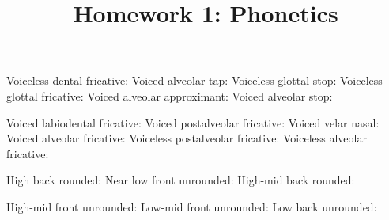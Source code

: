 \documentclass[addpoints]{exam}
\title{Homework 1: Phonetics}
\date{}
\begin{document}
  \maketitle

  


  \begin{questions}
      \parbox[t]{0.45\linewidth}{
        \question[1] \hrulefill
        \question[1] \hrulefill
        \question[1] \hrulefill
        \question[1] \hrulefill
        \question[1] \hrulefill
      }
      \hspace{0.1\linewidth}
      \parbox[t]{0.45\linewidth}{
        \question[1] \hrulefill
        \question[1] \hrulefill
        \question[1] \hrulefill
        \question[1] \hrulefill
        \question[1] \hrulefill
      }

      \parbox[t]{0.45\linewidth}{
        \question[1] Voiceless dental fricative: \hrulefill
        \question[1] Voiced alveolar tap: \hrulefill
        \question[1] Voiceless glottal stop: \hrulefill
        \question[1] Voiceless glottal fricative: \hrulefill
        \question[1] Voiced alveolar approximant: \hrulefill
        \question[1] Voiced alveolar stop: \hrulefill
      }
      \hspace{0.1\linewidth}
      \parbox[t]{0.45\linewidth}{
        \question[1] Voiced labiodental fricative: \hrulefill
        \question[1] Voiced postalveolar fricative: \hrulefill
        \question[1] Voiced velar nasal: \hrulefill
        \question[1] Voiced alveolar fricative: \hrulefill
        \question[1] Voiceless postalveolar fricative: \hrulefill
        \question[1] Voiceless alveolar fricative: \hrulefill
      }

      \parbox[t]{0.45\linewidth}{
        \question[1] High back rounded: \hrulefill
        \question[1] Near low front unrounded: \hrulefill
        \question[1] High-mid back rounded: \hrulefill
      }
      \hspace{0.1\linewidth}
      \parbox[t]{0.45\linewidth}{
        \question[1] High-mid front unrounded: \hrulefill
        \question[1] Low-mid front unrounded: \hrulefill
        \question[1] Low back unrounded: \hrulefill
      }


\end{questions}
\end{document}
